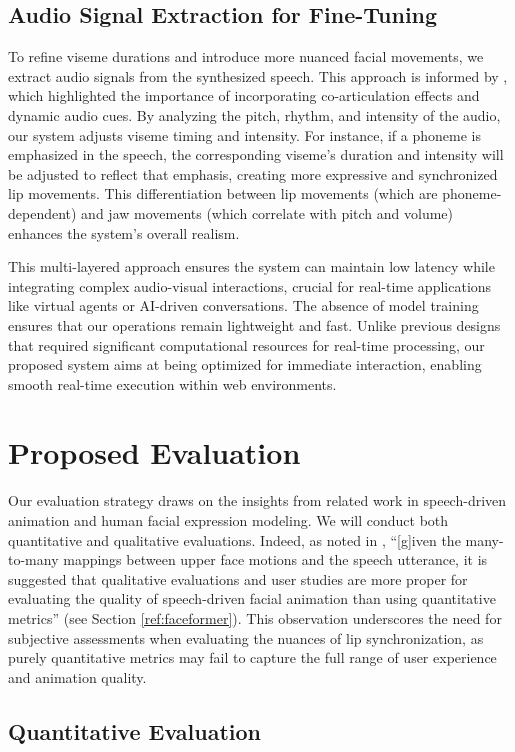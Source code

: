 \documentclass[12pt]{article}
\begin{document}
\subsection{Audio Signal Extraction for Fine-Tuning}
To refine viseme durations and introduce more nuanced facial movements, we extract audio signals from the synthesized speech. This approach is informed by  \cite{Taylor2012DynamicSpeech}, which highlighted the importance of incorporating co-articulation effects and dynamic audio cues. By analyzing the pitch, rhythm, and intensity of the audio, our system adjusts viseme timing and intensity. For instance, if a phoneme is emphasized in the speech, the corresponding viseme's duration and intensity will be adjusted to reflect that emphasis, creating more expressive and synchronized lip movements. This differentiation between lip movements (which are phoneme-dependent) and jaw movements (which correlate with pitch and volume) enhances the system’s overall realism.

This multi-layered approach ensures the system can maintain low latency while integrating complex audio-visual interactions, crucial for real-time applications like virtual agents or AI-driven conversations.  The absence of model training ensures that our operations remain lightweight and fast. Unlike previous designs that required significant computational resources for real-time processing, our proposed system aims at being optimized for immediate interaction, enabling smooth real-time execution within web environments.
\section{Proposed Evaluation}
\label{sec:eval}
Our evaluation strategy draws on the insights from related work in speech-driven animation and human facial expression modeling. We will conduct both quantitative and qualitative evaluations. Indeed, as noted in \cite{Fan2022}, ``[g]iven the many-to-many mappings between upper face motions and the speech utterance, it is suggested that qualitative evaluations and user studies are more proper for evaluating the quality of speech-driven facial animation than using quantitative metrics'' (see Section \ref{ref:faceformer}). This observation underscores the need for subjective assessments when evaluating the nuances of lip synchronization, as purely quantitative metrics may fail to capture the full range of user experience and animation quality.

\subsection{Quantitative Evaluation}
\end{document}
